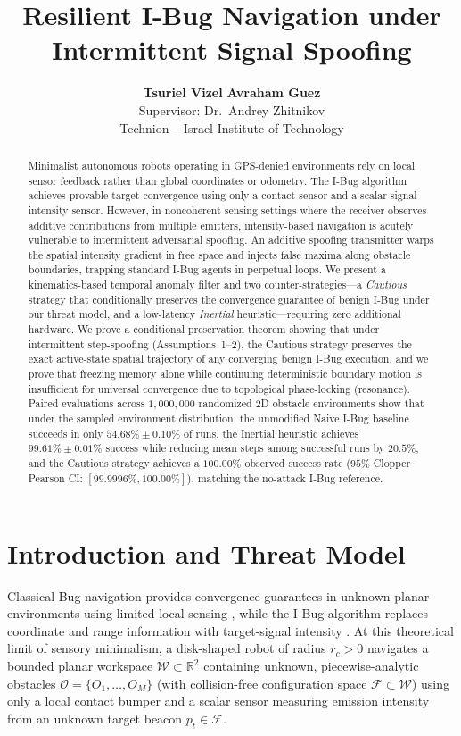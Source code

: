 \documentclass[10pt, a4paper, twocolumn]{article}
\title{\vspace{-1.2em}\Large\textbf{Resilient I-Bug Navigation under Intermittent Signal Spoofing}}
\author{
  \textbf{Tsuriel Vizel} \quad \textbf{Avraham Guez} \\
  \small Supervisor: Dr.\ Andrey Zhitnikov \\
  \small Technion -- Israel Institute of Technology \\
  \vspace{-1.2em}
}
\date{}
\begin{document}
\maketitle

\begin{abstract}
\noindent
Minimalist autonomous robots operating in GPS-denied environments rely on local sensor feedback rather than global coordinates or odometry. The I-Bug algorithm achieves provable target convergence using only a contact sensor and a scalar signal-intensity sensor. However, in noncoherent sensing settings where the receiver observes additive contributions from multiple emitters, intensity-based navigation is acutely vulnerable to intermittent adversarial spoofing. An additive spoofing transmitter warps the spatial intensity gradient in free space and injects false maxima along obstacle boundaries, trapping standard I-Bug agents in perpetual loops. We present a kinematics-based temporal anomaly filter and two counter-strategies—a \textit{Cautious} strategy that conditionally preserves the convergence guarantee of benign I-Bug under our threat model, and a low-latency \textit{Inertial} heuristic—requiring zero additional hardware. We prove a conditional preservation theorem showing that under intermittent step-spoofing (Assumptions~1--2), the Cautious strategy preserves the exact active-state spatial trajectory of any converging benign I-Bug execution, and we prove that freezing memory alone while continuing deterministic boundary motion is insufficient for universal convergence due to topological phase-locking (resonance). Paired evaluations across $1,000,000$ randomized 2D obstacle environments show that under the sampled environment distribution, the unmodified Naive I-Bug baseline succeeds in only $54.68\% \pm 0.10\%$ of runs, the Inertial heuristic achieves $99.61\% \pm 0.01\%$ success while reducing mean steps among successful runs by $20.5\%$, and the Cautious strategy achieves a $100.00\%$ observed success rate ($95\%$ Clopper--Pearson CI: $[99.9996\%, 100.00\%]$), matching the no-attack I-Bug reference.
\end{abstract}

\section{Introduction and Threat Model}
Classical Bug navigation provides convergence guarantees in unknown planar environments using limited local sensing \cite{lumelsky1987path, kamon1998tangentbug}, while the I-Bug algorithm replaces coordinate and range information with target-signal intensity \cite{taylor2009ibug, taylor2014intensity}. At this theoretical limit of sensory minimalism, a disk-shaped robot of radius $r_c > 0$ navigates a bounded planar workspace $\mathcal{W} \subset \mathbb{R}^2$ containing unknown, piecewise-analytic obstacles $\mathcal{O} = \{O_1, \dots, O_M\}$ (with collision-free configuration space $\mathcal{F} \subset \mathcal{W}$) using only a local contact bumper and a scalar sensor measuring emission intensity from an unknown target beacon $p_t \in \mathcal{F}$.
\end{document}
